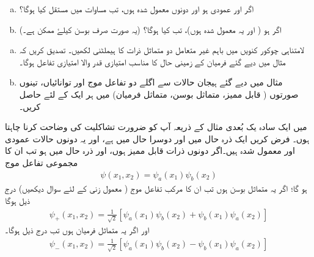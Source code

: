\begin{enumerate}[a.]
\item
اگر  اور  عمودی ہو اور دونوں معمول شدہ ہوں، تب مساوات  میں مستقل  کیا ہوگا؟ 
\item
اگر  ہو ( اور یہ معمول شدہ ہوں)، تب  کیا ہوگا؟ (یہ صورت صرف بوسن کیلۓ ممکن ہے۔)
\end{enumerate}
\begin{enumerate}[a.]
\item
لامتناہی چوکور کنویں میں باہم غیر متعامل دو متماثل ذرات کا ہیملٹنی لکھیں۔ تصدیق کریں کہ مثال  میں دیے گئے فرمیان کے زمینی حال  کا مناسب امتیازی قدر والا امتیازی تفاعل ہوگا۔ 
\item
مثال  میں دیے گئے ہیجان حالات سے اگلے دو تفاعل موج اور توانائیاں، تینوں صورتوں ( قابل ممیز، متماثل بوسن، متماثل فرمیان) میں ہر ایک کے لئے حاصل کریں۔
\end{enumerate}


میں ایک سادہ یک بُعدی مثال کے ذریعہ آپ کو ضرورت تشاکلیت کی وضاحت کرنا چاہتا ہوں۔ فرض کریں ایک ذرہ حال  میں اور دوسرا حال  میں ہے، اور یہ دونوں حالات عمودی اور معمول شدہ ہیں۔اگر دونوں ذرات قابل ممیز ہوں، اور ذرہ  حال  میں ہو تب ان کا مجموعی تفاعل موج
\begin{align}\label{مساوات_متماثل_مجموعی_تفاعل_موج_قابل_ممیز}
	\psi(x_1, x_2)=\psi_a(x_1)\psi_b(x_2)
\end{align}
ہو گا؛ اگر یہ متماثل بوسن ہوں تب ان کا مرکب تفاعل موج ( معمول زنی کے لئے سوال  دیکھیں) درج ذیل ہوگا
\begin{align}\label{مساوات_متماثل_مجموعی_تفاعل_موج_متماثل_بوسن}
	\psi_+(x_1, x_2) = \frac{1}{\sqrt{2}}[\psi_a(x_1)\psi_b(x_2)+\psi_b(x_1)\psi_a(x_2)]
\end{align}
اور اگر یہ متماثل فرمیان ہوں تب درج ذیل ہوگا۔
\begin{align}\label{مساوات_متماثل_مجموعی_تفاعل_موج_متماثل_فرمیان}
	\psi_-(x_1, x_2)=\frac{1}{\sqrt{2}}[\psi_a(x_1)\psi_b(x_2)-\psi_b(x_1)\psi_a(x_2)]
\end{align}


